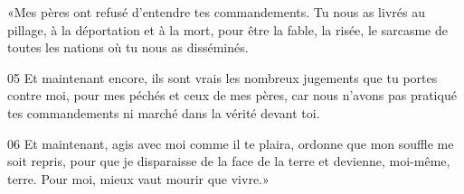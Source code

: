 «Mes pères ont refusé d’entendre tes commandements. Tu nous as livrés au pillage, à la déportation et à la mort, pour être la fable, la risée, le sarcasme de toutes les nations où tu nous as disséminés.

05 Et maintenant encore, ils sont vrais les nombreux jugements que tu portes contre moi, pour mes péchés et ceux de mes pères, car nous n’avons pas pratiqué tes commandements ni marché dans la vérité devant toi.

06 Et maintenant, agis avec moi comme il te plaira, ordonne que mon souffle me soit repris, pour que je disparaisse de la face de la terre et devienne, moi-même, terre. Pour moi, mieux vaut mourir que vivre.»